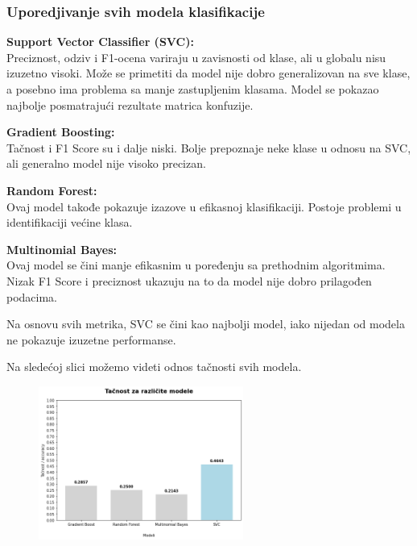 \documentclass{article}
\begin{document}
\newpage


\subsubsection{Uporedjivanje svih modela klasifikacije}

\begin{flushleft}
    \textbf{Support Vector Classifier (SVC): \\
}
Preciznost, odziv i F1-ocena variraju u zavisnosti od klase, ali u globalu nisu izuzetno visoki. Može se primetiti da model nije dobro generalizovan na sve klase, a posebno ima problema sa manje zastupljenim klasama. Model se pokazao najbolje posmatrajući rezultate matrica konfuzije. 

\vspace{2.75mm}
\textbf{Gradient Boosting:}\\

Tačnost i F1 Score su i dalje niski. Bolje prepoznaje neke klase u odnosu na SVC, ali generalno model nije visoko precizan.
\vspace{2.75mm}

\textbf{Random Forest:}\\
Ovaj model takođe pokazuje izazove u efikasnoj klasifikaciji. Postoje problemi u identifikaciji većine klasa.
\vspace{2.75mm}

\textbf{Multinomial Bayes:} \\
Ovaj model se čini manje efikasnim u poređenju sa prethodnim algoritmima. Nizak F1 Score i preciznost ukazuju na to da model nije dobro prilagođen podacima.

\vspace{2.75mm}

Na osnovu svih metrika, SVC se čini kao najbolji model, iako nijedan od modela ne pokazuje izuzetne performanse.

\vspace{2.75mm}

Na sledećoj slici možemo videti odnos tačnosti svih modela.

\vspace{6.75mm}
\end{flushleft}


\begin{figure}[ht]
    \centering
    \includegraphics[width=0.6\textwidth]{modeliACC.png}
    \captionsetup{labelformat=empty}
    \label{fig:nedostajuce}
\end{figure}
\vspace{2.75mm}
\end{document}
